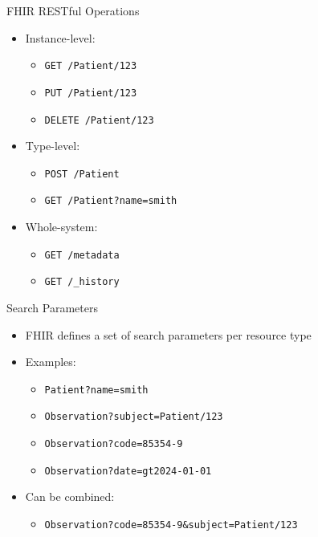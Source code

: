 \documentclass[aspectratio=1610]{beamer}
\begin{document}
	\begin{frame}{FHIR RESTful Operations}
		\begin{itemize}
			\item Instance-level:
			\begin{itemize}
				\item \texttt{GET /Patient/123}
				\item \texttt{PUT /Patient/123}
				\item \texttt{DELETE /Patient/123}
			\end{itemize}
			\item Type-level:
			\begin{itemize}
				\item \texttt{POST /Patient}
				\item \texttt{GET /Patient?name=smith}
			\end{itemize}
			\item Whole-system:
			\begin{itemize}
				\item \texttt{GET /metadata}
				\item \texttt{GET /\_history}
			\end{itemize}
		\end{itemize}
	\end{frame}
	
	\begin{frame}{Search Parameters}
		\begin{itemize}
			\item FHIR defines a set of search parameters per resource type
			\item Examples:
			\begin{itemize}
				\item \texttt{Patient?name=smith}
				\item \texttt{Observation?subject=Patient/123}
				\item \texttt{Observation?code=85354-9}
				\item \texttt{Observation?date=gt2024-01-01}
			\end{itemize}
			\item Can be combined:
			\begin{itemize}
				\item \texttt{Observation?code=85354-9\&subject=Patient/123}
			\end{itemize}
		\end{itemize}
	\end{frame}
	
\end{document}
